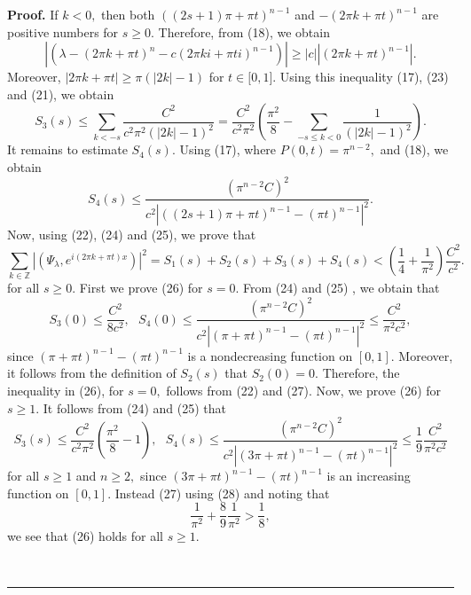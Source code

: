 \documentclass[10pt,a4paper]{amsart}
\newenvironment{proof}[1][Proof]{\textbf{#1.} }{\ \rule{0.5em}{0.5em}}
\begin{document}
\begin{proof}
If $k<0,$ then both $((2s+1)\pi+\pi t)^{n-1}$ and $-(2\pi k+\pi t)^{n-1}$ are
positive numbers for $s\geq0.$ Therefore, from (18), we obtain
\begin{equation}
\left\vert \left(  \lambda-\left(  2\pi k+\pi t\right)  ^{n}-c(2\pi ki+\pi
ti)^{n-1}\right)  \right\vert \geq\left\vert c\right\vert \left\vert (2\pi
k+\pi t)^{n-1}\right\vert . \tag{23}%
\end{equation}
Moreover, $\left\vert 2\pi k+\pi t\right\vert \geq\pi\left(  \left\vert
2k\right\vert -1\right)  $ for $t\in\lbrack0,1].$ Using this inequality (17),
(23) and (21), we obtain
\begin{equation}
S_{3}(s)\leq\sum_{k<-s}\frac{C^{2}}{c^{2}\pi^{2}(\left\vert 2k\right\vert
-1)^{2}}=\frac{C^{2}}{c^{2}\pi^{2}}\left(  \frac{\pi^{2}}{8}-\sum_{-s\leq
k<0}\frac{1}{(\left\vert 2k\right\vert -1)^{2}}\right)  . \tag{24}%
\end{equation}
It remains to estimate $S_{4}(s).$ Using (17), where $P(0,t)=\pi^{n-2},$ and
(18), we obtain
\begin{equation}
S_{4}(s)\leq\frac{\left(  \pi^{n-2}C\right)  ^{2}}{c^{2}\left\vert
((2s+1)\pi+\pi t)^{n-1}-(\pi t)^{n-1}\right\vert ^{2}}. \tag{25}%
\end{equation}
Now, using (22), (24) and (25), we prove that%
\begin{equation}
\sum_{k\in\mathbb{Z}}\left\vert \left(  \Psi_{\lambda},e^{i\left(  2\pi k+\pi
t\right)  x}\right)  \right\vert ^{2}=S_{1}(s)+S_{2}(s)+S_{3}(s)+S_{4}%
(s)<(\frac{1}{4}+\frac{1}{\pi^{2}})\frac{C^{2}}{c^{2}}. \tag{26}%
\end{equation}
for all $s\geq0.$ First we prove (26) for $s=0.$ From (24) and (25) , we
obtain that
\begin{equation}
S_{3}(0)\leq\frac{C^{2}}{8c^{2}},\text{ }S_{4}(0)\leq\frac{\left(  \pi
^{n-2}C\right)  ^{2}}{c^{2}\left\vert (\pi+\pi t)^{n-1}-(\pi t)^{n-1}%
\right\vert ^{2}}\leq\frac{C^{2}}{\pi^{2}c^{2}}, \tag{27}%
\end{equation}
since $(\pi+\pi t)^{n-1}-(\pi t)^{n-1}$ is a nondecreasing function on
$[0,1].$ Moreover, it follows from the definition of $S_{2}(s)$ that
$S_{2}(0)=0.$ Therefore, the inequality in (26), for $s=0,$ follows from (22)
and (27). Now, we prove (26) for $s\geq1.$ It follows from (24) and (25) that
\begin{equation}
S_{3}(s)\leq\frac{C^{2}}{c^{2}\pi^{2}}\left(  \frac{\pi^{2}}{8}-1\right)
,\text{ }S_{4}(s)\leq\frac{\left(  \pi^{n-2}C\right)  ^{2}}{c^{2}\left\vert
(3\pi+\pi t)^{n-1}-(\pi t)^{n-1}\right\vert ^{2}}\leq\frac{1}{9}\frac{C^{2}%
}{\pi^{2}c^{2}} \tag{28}%
\end{equation}
for all $s\geq1$ and $n\geq2,$ since $(3\pi+\pi t)^{n-1}-(\pi t)^{n-1}$ is an
increasing function on $[0,1].$ Instead (27) using (28) and noting that
\[
\frac{1}{\pi^{2}}+\frac{8}{9}\frac{1}{\pi^{2}}>\frac{1}{8},
\]
we see that (26) holds for all $s\geq1.$


\end{proof}
\end{document}
